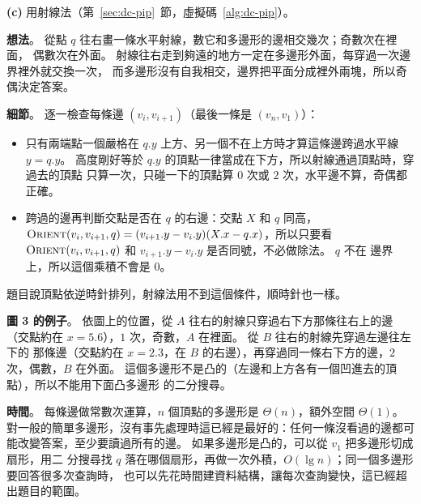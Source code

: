 \textbf{(c)} 用射線法（第~\ref{sec:dc-pip}~節，虛擬碼~\ref{alg:dc-pip}）。

\textbf{想法}。 從點 $q$ 往右畫一條水平射線，數它和多邊形的邊相交幾次；奇數次在裡面，
偶數次在外面。 射線往右走到夠遠的地方一定在多邊形外面，每穿過一次邊界裡外就交換一次，
而多邊形沒有自我相交，邊界把平面分成裡外兩塊，所以奇偶決定答案。

\textbf{細節}。 逐一檢查每條邊 $(v_i, v_{i+1})$（最後一條是 $(v_n, v_1)$）：
\begin{itemize}
\item 只有兩端點一個嚴格在 $q.y$ 上方、另一個不在上方時才算這條邊跨過水平線
$y = q.y$。 高度剛好等於 $q.y$ 的頂點一律當成在下方，所以射線通過頂點時，穿過去的頂點
只算一次，只碰一下的頂點算 $0$ 次或 $2$ 次，水平邊不算，奇偶都正確。
\item 跨過的邊再判斷交點是否在 $q$ 的右邊：交點 $X$ 和 $q$ 同高，
$\proc{Orient}(v_i, v_{i+1}, q) = (v_{i+1}.y - v_i.y)(X.x - q.x)$，所以只要看
$\proc{Orient}(v_i, v_{i+1}, q)$ 和 $v_{i+1}.y - v_i.y$ 是否同號，不必做除法。 $q$ 不在
邊界上，所以這個乘積不會是 $0$。
\end{itemize}
題目說頂點依逆時針排列，射線法用不到這個條件，順時針也一樣。

\textbf{圖 3 的例子}。 依圖上的位置，從 $A$ 往右的射線只穿過右下方那條往右上的邊
（交點約在 $x = 5.6$），$1$ 次，奇數，$A$ 在裡面。 從 $B$ 往右的射線先穿過左邊往左下的
那條邊（交點約在 $x = 2.3$，在 $B$ 的右邊），再穿過同一條右下方的邊，$2$ 次，偶數，$B$
在外面。 這個多邊形不是凸的（左邊和上方各有一個凹進去的頂點），所以不能用下面凸多邊形
的二分搜尋。

\textbf{時間}。 每條邊做常數次運算，$n$ 個頂點的多邊形是 $\Theta(n)$，額外空間
$\Theta(1)$。 對一般的簡單多邊形，沒有事先處理時這已經是最好的：任何一條沒看過的邊都可
能改變答案，至少要讀過所有的邊。 如果多邊形是凸的，可以從 $v_1$ 把多邊形切成扇形，用二
分搜尋找 $q$ 落在哪個扇形，再做一次外積，$O(\lg n)$；同一個多邊形要回答很多次查詢時，
也可以先花時間建資料結構，讓每次查詢變快，這已經超出題目的範圍。
